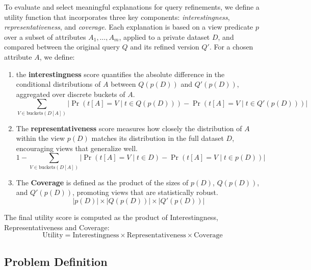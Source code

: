 To evaluate and select meaningful explanations for query refinements, we define a utility function that incorporates three key components: \textit{interestingness}, \textit{representativeness}, and \textit{coverage}. Each explanation is based on a view predicate $p$ over a subset of attributes $A_1, \dots, A_m$,  applied to a private dataset $D$, and compared between the original query $Q$ and its refined version $Q'$. For a chosen attribute $A$, we define:
\begin{enumerate}
    \item the \textbf{interestingness} score quantifies the absolute difference in the conditional distributions of $A$ between $Q(p(D))$ and $Q'(p(D))$, aggregated over discrete buckets of $A$.
    \[
\sum_{V \in \text{buckets}(D[A])} \left| \Pr(t[A] = V \mid t \in Q(p(D))) - \Pr(t[A] = V \mid t \in Q'(p(D))) \right|
\]

    \item The \textbf{representativeness} score measures how closely the distribution of $A$ within the view $p(D)$ matches its distribution in the full dataset $D$, encouraging views that generalize well. 
    \[
1 - \sum_{V \in \text{buckets}(D[A])} \left| \Pr(t[A] = V \mid t \in D) - \Pr(t[A] = V \mid t \in p(D)) \right|
\]

    \item The \textbf{Coverage} is defined as the product of the sizes of $p(D)$, $Q(p(D))$, and $Q'(p(D))$, promoting views that are statistically robust.
    \[
    |p(D)| \times |Q(p(D))| \times |Q'(p(D))|
\]

\end{enumerate}
  The final utility score is computed as the product of Interestingness, Representativeness and Coverage:
  \[
\text{Utility} = \text{Interestingness} \times \text{Representativeness} \times \text{Coverage}
\]


\subsection{Problem Definition}

